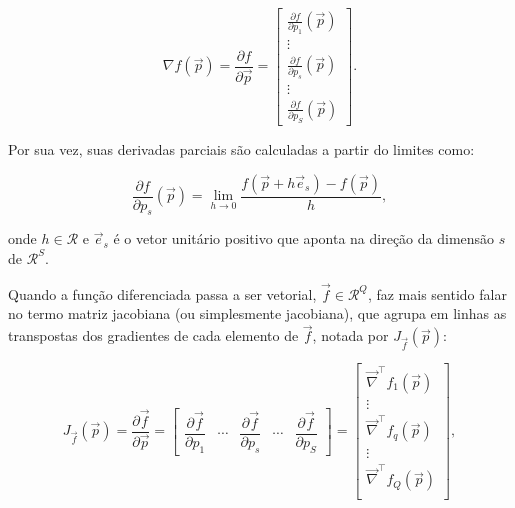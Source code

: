   \begin{equation} \label{e:gradiente_definicao}
    \nabla f(\vec{p}) =
    \dfrac{\partial f}{\partial \vec{p}} =
    \begin{bmatrix}
      \frac{\partial f}{\partial p_1}(\vec{p}) \\
      \vdots \\
      \frac{\partial f}{\partial p_s}(\vec{p}) \\
      \vdots \\
      \frac{\partial f}{\partial p_S}(\vec{p})
    \end{bmatrix}
    .
  \end{equation}

  \noindent Por sua vez, suas derivadas parciais são calculadas a partir do limites como:

  \begin{equation} \label{e:parcial_definicao}
    \frac{\partial f}{\partial p_s}(\vec{p}) =
      \lim_{h \to 0} \frac{
        f(\vec{p} + h \vec{e}_s) - f(\vec{p})
      }{h}
      ,
  \end{equation}

  \noindent onde $h \in \mathcal{R}$ e $\vec{e}_s$ é o vetor unitário positivo que aponta na direção da dimensão $s$ de $\mathcal{R}^S$.

  Quando a função diferenciada passa a ser vetorial, $\vec{f} \in \mathcal{R}^Q$, faz mais sentido falar no termo matriz jacobiana (ou simplesmente jacobiana), que agrupa em linhas as transpostas dos gradientes de cada elemento de $\vec{f}$, notada por $J_{\vec{f}}(\vec{p})$:

  \begin{equation} \label{e:del_definicao}
    J_{\vec{f}}(\vec{p}) =
      \dfrac{\partial \vec{f}}{\partial\vec{p}} =
      \begin{bmatrix}
        \dfrac{\partial \vec{f}}{\partial p_1} & \cdots & \dfrac{\partial \vec{f}}{\partial p_s} & \cdots & \dfrac{\partial \vec{f}}{\partial p_S}
      \end{bmatrix} =
      \begin{bmatrix}
        \vec{\nabla}^\top f_1(\vec{p}) \\
        \vdots \\
        \vec{\nabla}^\top f_q(\vec{p}) \\
        \vdots \\
        \vec{\nabla}^\top f_Q(\vec{p}) \\
      \end{bmatrix}
      ,
  \end{equation}


